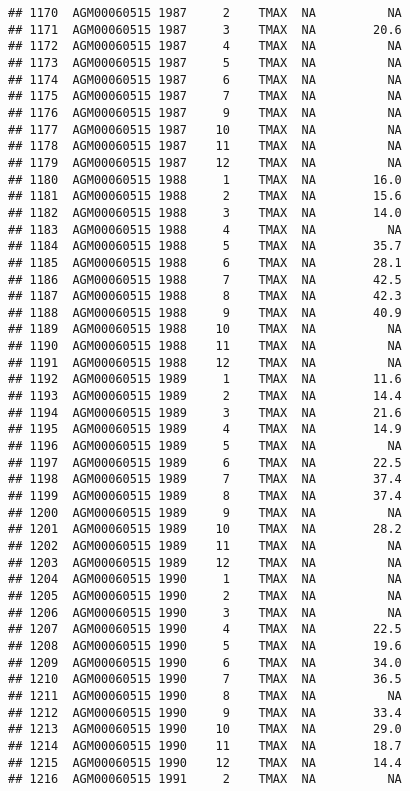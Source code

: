\documentclass{article}\usepackage[]{graphicx}\usepackage[]{color}
\makeatletter
\newenvironment{kframe}{%
 \def\at@end@of@kframe{}%
 \ifinner\ifhmode%
  \def\at@end@of@kframe{\end{minipage}}%
  \begin{minipage}{\columnwidth}%
 \fi\fi%
 \def\FrameCommand##1{\hskip\@totalleftmargin \hskip-\fboxsep
 \colorbox{shadecolor}{##1}\hskip-\fboxsep
     \hskip-\linewidth \hskip-\@totalleftmargin \hskip\columnwidth}%
 \MakeFramed {\advance\hsize-\width
   \@totalleftmargin\z@ \linewidth\hsize
   \@setminipage}}%
 {\par\unskip\endMakeFramed%
 \at@end@of@kframe}
\newenvironment{knitrout}{}{} %
\makeatother
\begin{document}
\begin{knitrout}
\begin{kframe}
\begin{verbatim}
## 1170  AGM00060515 1987     2    TMAX  NA          NA
## 1171  AGM00060515 1987     3    TMAX  NA        20.6
## 1172  AGM00060515 1987     4    TMAX  NA          NA
## 1173  AGM00060515 1987     5    TMAX  NA          NA
## 1174  AGM00060515 1987     6    TMAX  NA          NA
## 1175  AGM00060515 1987     7    TMAX  NA          NA
## 1176  AGM00060515 1987     9    TMAX  NA          NA
## 1177  AGM00060515 1987    10    TMAX  NA          NA
## 1178  AGM00060515 1987    11    TMAX  NA          NA
## 1179  AGM00060515 1987    12    TMAX  NA          NA
## 1180  AGM00060515 1988     1    TMAX  NA        16.0
## 1181  AGM00060515 1988     2    TMAX  NA        15.6
## 1182  AGM00060515 1988     3    TMAX  NA        14.0
## 1183  AGM00060515 1988     4    TMAX  NA          NA
## 1184  AGM00060515 1988     5    TMAX  NA        35.7
## 1185  AGM00060515 1988     6    TMAX  NA        28.1
## 1186  AGM00060515 1988     7    TMAX  NA        42.5
## 1187  AGM00060515 1988     8    TMAX  NA        42.3
## 1188  AGM00060515 1988     9    TMAX  NA        40.9
## 1189  AGM00060515 1988    10    TMAX  NA          NA
## 1190  AGM00060515 1988    11    TMAX  NA          NA
## 1191  AGM00060515 1988    12    TMAX  NA          NA
## 1192  AGM00060515 1989     1    TMAX  NA        11.6
## 1193  AGM00060515 1989     2    TMAX  NA        14.4
## 1194  AGM00060515 1989     3    TMAX  NA        21.6
## 1195  AGM00060515 1989     4    TMAX  NA        14.9
## 1196  AGM00060515 1989     5    TMAX  NA          NA
## 1197  AGM00060515 1989     6    TMAX  NA        22.5
## 1198  AGM00060515 1989     7    TMAX  NA        37.4
## 1199  AGM00060515 1989     8    TMAX  NA        37.4
## 1200  AGM00060515 1989     9    TMAX  NA          NA
## 1201  AGM00060515 1989    10    TMAX  NA        28.2
## 1202  AGM00060515 1989    11    TMAX  NA          NA
## 1203  AGM00060515 1989    12    TMAX  NA          NA
## 1204  AGM00060515 1990     1    TMAX  NA          NA
## 1205  AGM00060515 1990     2    TMAX  NA          NA
## 1206  AGM00060515 1990     3    TMAX  NA          NA
## 1207  AGM00060515 1990     4    TMAX  NA        22.5
## 1208  AGM00060515 1990     5    TMAX  NA        19.6
## 1209  AGM00060515 1990     6    TMAX  NA        34.0
## 1210  AGM00060515 1990     7    TMAX  NA        36.5
## 1211  AGM00060515 1990     8    TMAX  NA          NA
## 1212  AGM00060515 1990     9    TMAX  NA        33.4
## 1213  AGM00060515 1990    10    TMAX  NA        29.0
## 1214  AGM00060515 1990    11    TMAX  NA        18.7
## 1215  AGM00060515 1990    12    TMAX  NA        14.4
## 1216  AGM00060515 1991     2    TMAX  NA          NA

\end{verbatim}
\end{kframe}
\end{knitrout}
\end{document}

